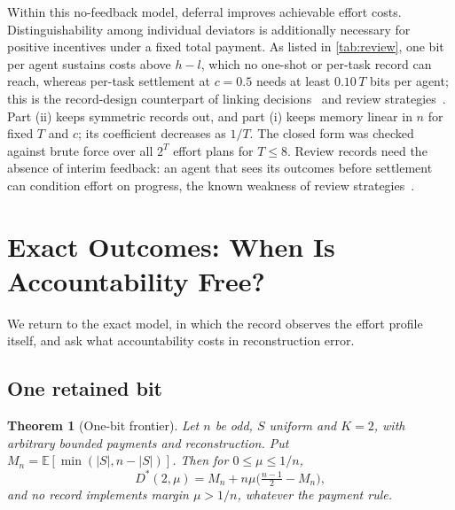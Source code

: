 \documentclass[sigconf,anonymous,acmthm=false]{aamas}
\theoremstyle{acmplain}
\newtheorem{theorem}{Theorem}
\theoremstyle{acmdefinition}
\newcommand{\E}{\mathbb{E}}
\begin{document}
Within this no-feedback model, deferral improves achievable effort costs. Distinguishability among individual deviators is additionally necessary for positive incentives under a fixed total payment. As listed in \cref{tab:review}, one bit per agent sustains costs above $h-l$, which no
one-shot or per-task record can reach, whereas per-task settlement at $c=0.5$ needs at least
$0.10\,T$ bits per agent; this is the record-design counterpart of linking
decisions~\cite{jacksonsonnenschein2007} and review strategies~\cite{radner1985repeated}.
Part (ii) keeps symmetric records out, and part (i) keeps memory linear in $n$ for fixed $T$ and $c$; its coefficient decreases as $1/T$. The closed form
was checked against brute force over all $2^T$ effort plans for $T\le8$. Review records need
the absence of interim feedback: an agent that sees its outcomes before settlement can condition
effort on progress, the known weakness of review strategies~\cite{radner1985repeated}.

\section{Exact Outcomes: When Is Accountability Free?}\label{sec:exact}


We return to the exact model, in which the record observes the effort profile itself, and
ask what accountability costs in reconstruction error.

\subsection{One retained bit}\label{sec:onebit}

\begin{theorem}[One-bit frontier]\label{thm:onebit}
Let $n$ be odd, $S$ uniform and $K=2$, with arbitrary bounded payments and reconstruction.
Put $M_n=\E[\min(|S|,n-|S|)]$. Then for $0\le\mu\le1/n$,
\[ D^*(2,\mu)=M_n+n\mu\Big(\tfrac{n-1}{2}-M_n\Big), \]
and no record implements margin $\mu>1/n$, whatever the payment rule.
\end{theorem}
\end{document}
